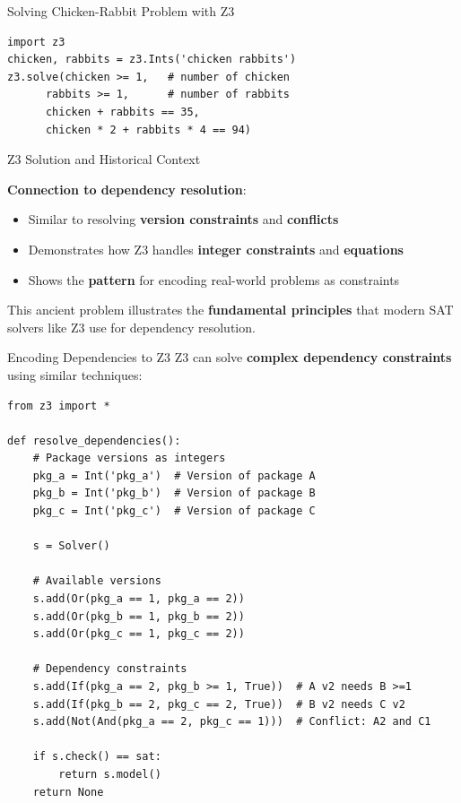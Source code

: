 \documentclass{beamer}
\begin{document}
\begin{frame}[fragile,t]{Solving Chicken-Rabbit Problem with Z3}
\scriptsize
    \begin{verbatim}
import z3
chicken, rabbits = z3.Ints('chicken rabbits')
z3.solve(chicken >= 1,   # number of chicken
      rabbits >= 1,      # number of rabbits
      chicken + rabbits == 35,
      chicken * 2 + rabbits * 4 == 94)
\end{verbatim}
\end{frame}

\begin{frame}[t]{Z3 Solution and Historical Context}

\textbf{Connection to dependency resolution}:
\begin{itemize}
\item Similar to resolving \textbf{version constraints} and \textbf{conflicts}
\item Demonstrates how Z3 handles \textbf{integer constraints} and \textbf{equations}
\item Shows the \textbf{pattern} for encoding real-world problems as constraints
\end{itemize}

This ancient problem illustrates the \textbf{fundamental principles} that modern SAT solvers like Z3 use for dependency resolution.
\end{frame}

\begin{frame}[fragile,t]{Encoding Dependencies to Z3}
Z3 can solve \textbf{complex dependency constraints} using similar techniques:

\begin{verbatim}
from z3 import *

def resolve_dependencies():
    # Package versions as integers
    pkg_a = Int('pkg_a')  # Version of package A
    pkg_b = Int('pkg_b')  # Version of package B
    pkg_c = Int('pkg_c')  # Version of package C
    
    s = Solver()
    
    # Available versions
    s.add(Or(pkg_a == 1, pkg_a == 2))
    s.add(Or(pkg_b == 1, pkg_b == 2))
    s.add(Or(pkg_c == 1, pkg_c == 2))
    
    # Dependency constraints
    s.add(If(pkg_a == 2, pkg_b >= 1, True))  # A v2 needs B >=1
    s.add(If(pkg_b == 2, pkg_c == 2, True))  # B v2 needs C v2
    s.add(Not(And(pkg_a == 2, pkg_c == 1)))  # Conflict: A2 and C1
    
    if s.check() == sat:
        return s.model()
    return None
\end{verbatim}
\end{frame}
\end{document}
